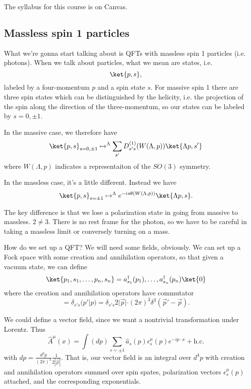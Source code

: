 The syllabus for this course is on Canvas.

\subsection*{Massless spin 1 particles}
What we're gonna start talking about is QFTs with massless spin 1 particles (i.e. photons). When we talk about particles, what we mean are states, i.e.
\begin{equation}
    \ket{p,s},
\end{equation}
labeled by a four-momentum $p$ and a spin state $s$. For massive spin 1 there are three spin states which can be distinguished by the helicity, i.e. the projection of the spin along the direction of the three-momentum, so our states can be labeled by $s=0,\pm 1$.

In the massive case, we therefore have
\begin{equation}
    \ket{p,s}_{s=0,\pm 1} \mapsto^\Lambda \sum_{s'} D_{s's}^{(1)}(W(\Lambda, p)) \ket{\Lambda p,s'}
\end{equation}
where $W(\Lambda,p)$ indicates a representaiton of the $SO(3)$ symmetry.

In the massless case, it's a little different. Instead we have
\begin{equation}
    \ket{p,s}_{s=\pm 1} \mapsto^\Lambda e^{-is \theta(W(\Lambda,p))}\ket{\Lambda p,s}.
\end{equation}

The key difference is that we lose a polarization state in going from massive to massless. $2\neq 3$. There is no rest frame for the photon, so we have to be careful in taking a massless limit or conversely turning on a mass.

How do we set up a QFT? We will need some fields, obviously. We can set up a Fock space with some creation and annihilation operators, so that given a vacuum state, we can define
\begin{equation}
    \ket{p_1,s_1,\ldots, p_n,s_n}=a_{s_1}^\dagger(p_1),\ldots,a_{s_n}^\dagger (p_n) \ket{0}
\end{equation}
where the creation and annihilation operators have commutator
\begin{equation}
    [a_{s'}(p'),a_s^\dagger(p)]=\delta_{s's}(p'|p)=\delta_{s's} 2|\vec p| \cdot (2\pi)^3 \delta^3(\vec {p}'-\vec{p}).
\end{equation}

We could define a vector field, since we want a nontrivial transformation under Lorentz. Thus
\begin{equation}
    \hat A^\mu(x) = \int(dp)\sum_{s=\pm1} \hat a_s (p) \epsilon_s^\mu(p) e^{-ip\cdot x} + \text{h.c.}
\end{equation}
with $dp=\frac{d^3p}{(2\pi)^3} \frac{1}{2|\vec{p}|}$. That is, our vector field is an integral over $d^4p$ with creation and annihilation operators summed over spin spates, polarization vectors $\epsilon^\mu_s(p)$ attached, and the corresponding exponentials.

